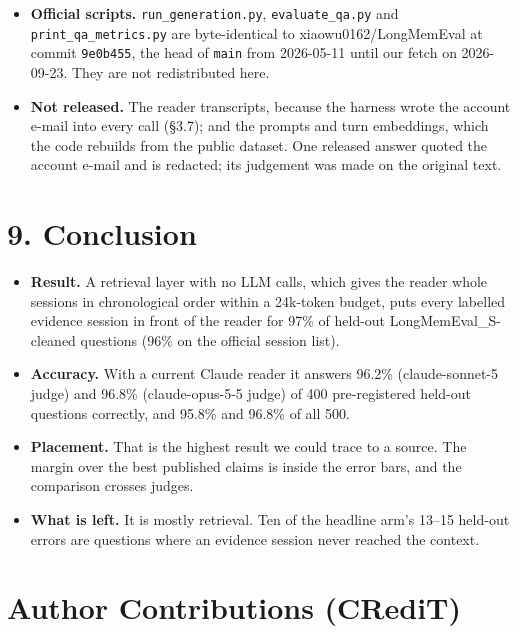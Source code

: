 \documentclass[11pt]{article}
\providecommand{\tightlist}{\setlength{\itemsep}{0pt}\setlength{\parskip}{0pt}}
\begin{document}
\begin{itemize}
\item
  \textbf{Official scripts.} \texttt{run\_generation.py}, \texttt{evaluate\_qa.py} and \texttt{print\_qa\_metrics.py} are byte-identical to
  xiaowu0162/LongMemEval at commit \texttt{9e0b455}, the head of \texttt{main} from 2026-05-11 until our fetch on
  2026-09-23. They are not redistributed here.
\item
  \textbf{Not released.} The reader transcripts, because the harness wrote the account e-mail into every call
  (§3.7); and the prompts and turn embeddings, which the code rebuilds from the public dataset. One released
  answer quoted the account e-mail and is redacted; its judgement was made on the original text.
\end{itemize}

\hypertarget{conclusion}{%
\section{9. Conclusion}\label{conclusion}}

\begin{itemize}
\tightlist
\item
  \textbf{Result.} A retrieval layer with no LLM calls, which gives the reader whole sessions in chronological
  order within a 24k-token budget, puts every labelled evidence session in front of the reader for 97\% of
  held-out LongMemEval\_S-cleaned questions (96\% on the official session list).
\item
  \textbf{Accuracy.} With a current Claude reader it answers 96.2\% (claude-sonnet-5 judge) and 96.8\%
  (claude-opus-5-5 judge) of 400 pre-registered held-out questions correctly, and 95.8\% and 96.8\% of all 500.
\item
  \textbf{Placement.} That is the highest result we could trace to a source. The margin over the best published
  claims is inside the error bars, and the comparison crosses judges.
\item
  \textbf{What is left.} It is mostly retrieval. Ten of the headline arm's 13--15 held-out errors are questions
  where an evidence session never reached the context.
\end{itemize}

\hypertarget{author-contributions-credit}{%
\section{Author Contributions (CRediT)}\label{author-contributions-credit}}
\end{document}
